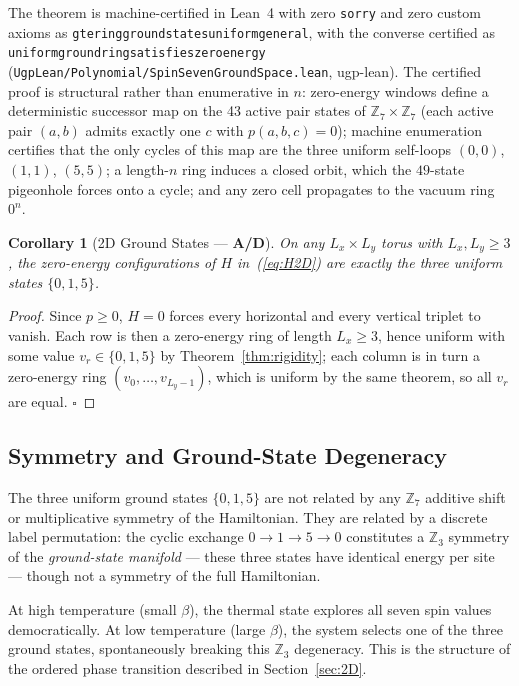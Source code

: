 \documentclass[11pt]{article}
\newtheorem{corollary}[theorem]{Corollary}
\theoremstyle{remark}
\newcommand{\lean}[1]{%
  \penalty-100
  \begingroup\def\_{\textunderscore\allowbreak}\texttt{#1}\endgroup}
\newcommand{\CatAD}{\textbf{A/D}}
\begin{document}
The theorem is machine-certified in Lean~4 with zero \texttt{sorry} and zero
custom axioms as \lean{gte\_ring\_ground\_states\_uniform\_general}, with the
converse certified as \lean{uniform\_ground\_ring\_satisfies\_zero\_energy}
(\texttt{UgpLean/Polynomial/SpinSevenGroundSpace.lean}, ugp-lean). The certified
proof is structural rather than enumerative in $n$: zero-energy windows define
a deterministic successor map on the 43 active pair states of
$\mathbb{Z}_7 \times \mathbb{Z}_7$ (each active pair $(a,b)$ admits exactly one
$c$ with $p(a,b,c) = 0$); machine enumeration certifies that the only cycles of
this map are the three uniform self-loops $(0,0)$, $(1,1)$, $(5,5)$; a
length-$n$ ring induces a closed orbit, which the $49$-state pigeonhole forces
onto a cycle; and any zero cell propagates to the vacuum ring $0^n$.

\begin{corollary}[2D Ground States --- \CatAD{}]\label{cor:2d-gs}
On any $L_x \times L_y$ torus with $L_x, L_y \ge 3$, the zero-energy
configurations of $H$ in~(\ref{eq:H2D}) are exactly the three uniform states
$\{0, 1, 5\}$.
\end{corollary}

\begin{proof}
Since $p \ge 0$, $H = 0$ forces every horizontal and every vertical triplet to
vanish. Each row is then a zero-energy ring of length $L_x \ge 3$, hence
uniform with some value $v_r \in \{0, 1, 5\}$ by Theorem~\ref{thm:rigidity};
each column is in turn a zero-energy ring $(v_0, \ldots, v_{L_y-1})$, which is
uniform by the same theorem, so all $v_r$ are equal. $\square$
\end{proof}

\subsection{Symmetry and Ground-State Degeneracy}

The three uniform ground states $\{0, 1, 5\}$ are not related by any $\mathbb{Z}_7$
additive shift or multiplicative symmetry of the Hamiltonian. They are related by a
discrete label permutation: the cyclic exchange $0 \to 1 \to 5 \to 0$ constitutes
a $\mathbb{Z}_3$ symmetry of the \emph{ground-state manifold} — these three states
have identical energy per site — though not a symmetry of the full Hamiltonian.

At high temperature (small $\beta$), the thermal state explores all seven spin values
democratically. At low temperature (large $\beta$), the system selects one of the
three ground states, spontaneously breaking this $\mathbb{Z}_3$ degeneracy. This is
the structure of the ordered phase transition described in Section~\ref{sec:2D}.
\end{document}
